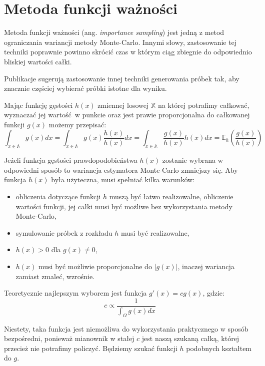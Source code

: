 \documentclass[../main.tex]{subfiles}
\begin{document}
\section{Metoda funkcji ważności}

Metoda funkcji ważności (ang. \textit{importance sampling}) jest jedną z metod ograniczania wariancji metody Monte-Carlo. Innymi słowy, zastosowanie tej techniki poprawnie powinno skrócić czas w którym ciąg zbiegnie do odpowiednio bliskiej wartości całki.

Publikacje \cite{Veach,MonteCarloAnderson} sugerują zastosowanie innej techniki generowania próbek tak, aby znacznie częściej wybierać próbki istotne dla wyniku.

Mając funkcję gęstości $h(x)$ zmiennej losowej $\mathbb{X}$ na której potrafimy całkować, wyznaczać jej wartość w punkcie oraz jest prawie proporcjonalna do całkowanej funkcji $g(x)$ możemy przepisać:
\[
  \int_{x \in \mathbb{A}} { g(x) dx } =
  \int_{x \in \mathbb{A}} { g(x) \frac{h(x)}{h(x)} dx } =
  \int_{x \in \mathbb{A}} { \frac{g(x)}{h(x)} h(x) dx } =
  \mathbb{E}_{h}\left({ \frac{g(x)}{h(x)} }\right)
\]

Jeżeli funkcja gęstości prawdopodobieństwa $h(x)$ zostanie wybrana w odpowiedni sposób to wariancja estymatora Monte-Carlo zmniejszy się. Aby funkcja $h(x)$ była użyteczna, musi spełniać kilka warunków:

\begin{itemize}

  \item obliczenia dotyczące funkcji $h$ muszą być łatwo realizowalne, obliczenie wartości funkcji, jej całki musi być możliwe bez wykorzystania metody Monte-Carlo,

  \item symulowanie próbek z rozkładu $h$ musi być realizowalne,

  \item $h(x) > 0$ dla $g(x) \neq 0$,

  \item $h(x)$ musi być możliwie proporcjonalne do $|g(x)|$, inaczej wariancja zamiast zmaleć, wzrośnie.

\end{itemize}

Teoretycznie najlepszym wyborem jest funkcja $g'(x) = cg(x)$, gdzie:
\[
	c \propto \frac{1}{\int_{\Omega}{g(x)dx}}
\]

\noindent Niestety, taka funkcja jest niemożliwa do wykorzystania praktycznego w sposób bezpośredni, ponieważ mianownik w stałej $c$ jest naszą szukaną całką, której przecież nie potrafimy policzyć. Będziemy szukać funkcji $h$ podobnych kształtem do $g$.
\end{document}

